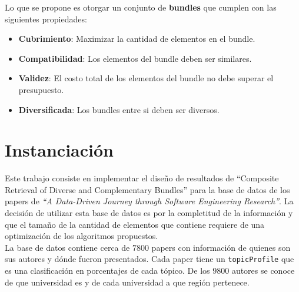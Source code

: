 Lo que se propone es otorgar un conjunto de \textbf{bundles} que cumplen con las siguientes propiedades:
\begin{itemize}
  \item \textbf{Cubrimiento}: Maximizar la cantidad de elementos en el bundle.
  \item \textbf{Compatibilidad}: Los elementos del bundle deben ser similares.
  \item \textbf{Validez}: El costo total de los elementos del bundle no debe superar el presupuesto.
  \item \textbf{Diversificada}: Los bundles entre si deben ser diversos.
\end{itemize}

\section{Instanciación}
Este trabajo consiste en implementar el diseño de resultados de ``Composite Retrieval of Diverse and Complementary Bundles'' 
para la base de datos de los papers de \textit{\textquotedblleft A Data-Driven Journey through Software Engineering Research\textquotedblright}\cite{dataDrive}.
La decisión de utilizar esta base de datos es por la completitud de la información y que el tamaño de la cantidad de elementos
que contiene requiere de una optimización de los algoritmos propuestos.\\

La base de datos contiene cerca de $7800$ papers con información de quienes son sus autores y dónde fueron presentados. 
Cada paper tiene un \texttt{topicProfile} que es una clasificación en porcentajes de cada tópico. De los $9800$ autores se conoce de que universidad es y de cada universidad a que región pertenece.
